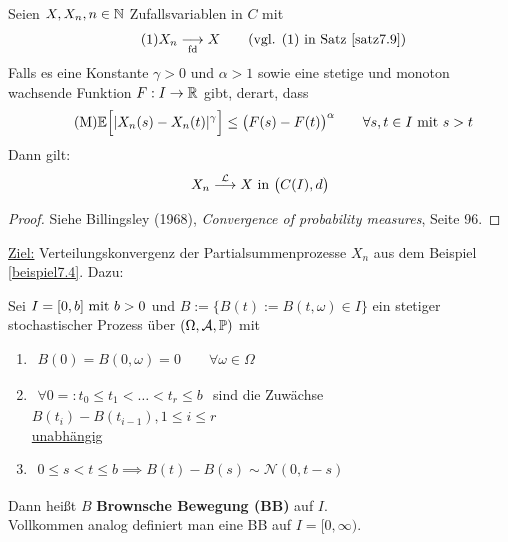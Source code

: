 \begin{satz}\label{satz7.11MomentenkriteriumVonKolmogoroff}\enter
	Seien $X,X_n,n\in\N$ Zufallsvariablen in $C$ mit
	\begin{align}\label{eqSatz7.11Vor1}\tag{1}
		X_n\stackrelnew{\text{fd}}{}{\longrightarrow} X\qquad\text{(vgl. (1) in Satz \ref{satz7.9})}
	\end{align}
	Falls es eine Konstante $\gamma>0$ und $\alpha>1$ sowie eine stetige und monoton wachsende Funktion $F:I\to\R$ gibt, derart, dass
	\begin{align}\label{eqSatz7.11VorM}\tag{M}
		\E\Big[|X_n(s)-X_n(t)|^\gamma\Big]\leq\big(F(s)-F(t)\big)^\alpha\qquad\forall s,t\in I\mit s>t
	\end{align}
	Dann gilt:
	\begin{align*}
		X_n\stackrel{\L}{\longrightarrow} X\text{ in }\big(C(I),d\big)
	\end{align*}
\end{satz}

\begin{proof}
	Siehe Billingsley (1968), \textit{Convergence of probability measures}, Seite 96.
\end{proof}

\ul{Ziel:} Verteilungskonvergenz der Partialsummenprozesse $X_n$ aus dem Beispiel \ref{beispiel7.4}. 
Dazu:

\begin{definition}\label{def7.12} %
	Sei $I=[0,b]\mit b>0$ und $B:=\big\lbrace B(t):=B(t,\omega)\in I\big\rbrace$ ein stetiger stochastischer Prozess über $(\Omega,\A,\P)$ mit 
	\begin{enumerate}[label=(\arabic*)]
		\item $\begin{aligned}
			B(0)=B(0,\omega)=0\qquad\forall\omega\in\Omega
		\end{aligned}$
		\item $\begin{aligned}
			\forall 0=:t_0\leq t_1<\ldots<t_r\leq b
		\end{aligned}$ sind die Zuwächse $B(t_i)-B(t_{i-1}),1\leq i\leq r$\\ \ul{unabhängig}
		\item $\begin{aligned}
			0\leq s<t\leq b\implies B(t)-B(s)\sim\mathcal{N}(0,t-s)
		\end{aligned}$
	\end{enumerate}
	Dann heißt $B$ \textbf{Brownsche Bewegung (BB)} auf $I$.\\
	Vollkommen analog definiert man eine BB auf $I=[0,\infty)$.
\end{definition}

